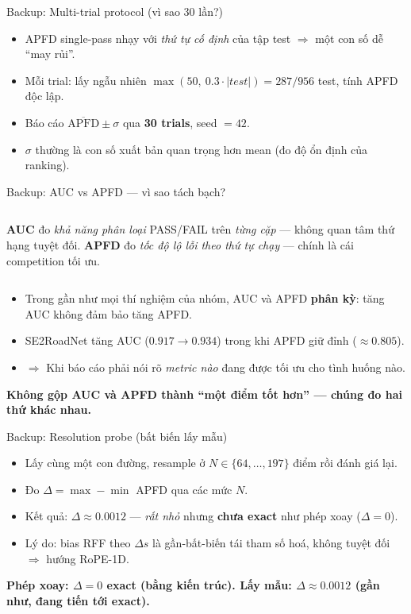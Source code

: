 \documentclass[aspectratio=169,10pt]{beamer}
\newcommand{\takeaway}[1]{%
  \vspace{0.3em}%
  \begin{mdframed}[linecolor=mLightBrown,linewidth=1.2pt,
    backgroundcolor=mLightBrown!8,
    innertopmargin=4pt,innerbottommargin=4pt,
    innerleftmargin=8pt,innerrightmargin=8pt,roundcorner=2pt]
  \centering\footnotesize\bfseries\color{mDarkTeal} #1
  \end{mdframed}}
\begin{document}
\begin{frame}{Backup: Multi-trial protocol (vì sao 30 lần?)}
\footnotesize
\begin{itemize}\setlength{\itemsep}{0.5em}
  \item APFD single-pass nhạy với \emph{thứ tự cố định} của tập test $\Rightarrow$ một con số dễ ``may rủi''.
  \item Mỗi trial: lấy ngẫu nhiên $\max(50,\ 0.3\cdot|test|)=287/956$ test, tính APFD độc lập.
  \item Báo cáo $\overline{\mathrm{APFD}}\pm\sigma$ qua \textbf{30 trials}, seed $=42$.
  \item $\sigma$ thường là con số xuất bản quan trọng hơn mean (đo độ ổn định của ranking).
\end{itemize}
\centering
{}
\end{frame}

\begin{frame}{Backup: AUC vs APFD — vì sao tách bạch?}
\footnotesize
\begin{columns}[T]
\textbf{\color{navydeep}AUC} đo \emph{khả năng phân loại} PASS/FAIL trên \emph{từng cặp} — không quan tâm thứ hạng tuyệt đối.
\textbf{\color{mLightBrown}APFD} đo \emph{tốc độ lộ lỗi theo thứ tự chạy} — chính là cái competition tối ưu.
\end{columns}
\vspace{0.5em}
\begin{itemize}\setlength{\itemsep}{0.35em}
  \item Trong gần như mọi thí nghiệm của nhóm, AUC và APFD \textbf{phân kỳ}: tăng AUC không đảm bảo tăng APFD.
  \item SE2RoadNet tăng AUC ($0.917\to 0.934$) trong khi APFD giữ đỉnh ($\approx 0.805$).
  \item $\Rightarrow$ Khi báo cáo phải nói rõ \emph{metric nào} đang được tối ưu cho tình huống nào.
\end{itemize}
\takeaway{Không gộp AUC và APFD thành ``một điểm tốt hơn'' — chúng đo hai thứ khác nhau.}
\end{frame}

\begin{frame}{Backup: Resolution probe (bất biến lấy mẫu)}
\footnotesize
\begin{itemize}\setlength{\itemsep}{0.5em}
  \item Lấy cùng một con đường, resample ở $N\in\{64,\dots,197\}$ điểm rồi đánh giá lại.
  \item Đo $\Delta=\max-\min$ APFD qua các mức $N$.
  \item Kết quả: $\Delta\approx \mathbf{0.0012}$ — \emph{rất nhỏ} nhưng \textbf{chưa exact} như phép xoay ($\Delta=0$).
  \item Lý do: bias RFF theo $\Delta s$ là gần-bất-biến tái tham số hoá, không tuyệt đối $\Rightarrow$ hướng RoPE-1D.
\end{itemize}
\takeaway{Phép xoay: $\Delta=0$ exact (bằng kiến trúc). Lấy mẫu: $\Delta\approx 0.0012$ (gần như, đang tiến tới exact).}
\end{frame}
\end{document}
